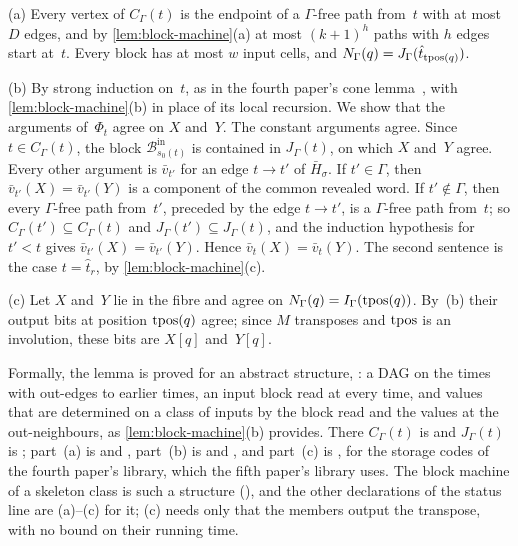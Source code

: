 \begin{outline}
(a) Every vertex of $C_\Gamma(t)$ is the endpoint of a $\Gamma$-free path from~$t$ with at most $D$ edges, and by
\cref{lem:block-machine}(a) at most $(k+1)^h$ paths with $h$ edges start at~$t$. Every block has at most $w$ input
cells, and $N_\Gamma(q)=J_\Gamma(\hat t_{\operatorname{tpos}(q)})$.

(b) By strong induction on~$t$, as in the fourth paper's cone lemma~\cite[Lemma~4.4]{FourthPaper2026}, with
\cref{lem:block-machine}(b) in place of its local recursion. We show that the arguments of~$\Phi_t$ agree on $X$
and~$Y$. The constant arguments agree. Since $t\in C_\Gamma(t)$, the block $\mathcal B^{\mathrm{in}}_{s_0(t)}$ is
contained in $J_\Gamma(t)$, on which $X$ and~$Y$ agree. Every other argument is $\bar v_{t'}$ for an edge $t\to t'$ of
$\bar H_\sigma$. If $t'\in\Gamma$, then $\bar v_{t'}(X)=\bar v_{t'}(Y)$ is a component of the common revealed word. If
$t'\notin\Gamma$, then every $\Gamma$-free path from~$t'$, preceded by the edge $t\to t'$, is a $\Gamma$-free path
from~$t$; so $C_\Gamma(t')\subseteq C_\Gamma(t)$ and $J_\Gamma(t')\subseteq J_\Gamma(t)$, and the induction hypothesis
for $t'<t$ gives $\bar v_{t'}(X)=\bar v_{t'}(Y)$. Hence $\bar v_t(X)=\bar v_t(Y)$. The second sentence is the case
$t=\hat t_r$, by \cref{lem:block-machine}(c).

(c) Let $X$ and~$Y$ lie in the fibre and agree on $N_\Gamma(q)=I_\Gamma(\operatorname{tpos}(q))$. By~(b) their output bits at position
$\operatorname{tpos}(q)$ agree; since $M$ transposes and $\operatorname{tpos}$ is an involution, these bits are $X[q]$ and~$Y[q]$.

Formally, the lemma is proved for an abstract structure, : a DAG on the times with
out-edges to earlier times, an input block read at every time, and values that are determined on a class of inputs by
the block read and the values at the out-neighbours, as \cref{lem:block-machine}(b) provides. There $C_\Gamma(t)$ is
 and $J_\Gamma(t)$ is ; part~(a) is
 and , part~(b) is
 and , and part~(c) is
, for the storage codes  of the
fourth paper's library, which the fifth paper's library uses. The block machine of a skeleton class is such a structure
(), and the other declarations of the status line are (a)--(c) for it; (c) needs only that
the members output the transpose, with no bound on their running time.
\end{outline}


